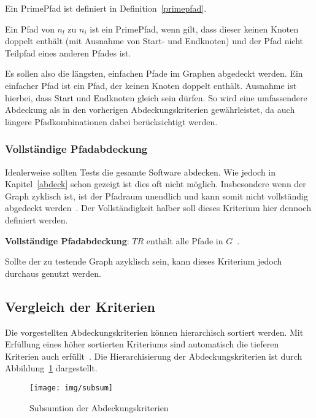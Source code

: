 Ein PrimePfad ist definiert in Definition~\ref{primepfad}.

\begin{definition}
    Ein Pfad von $n_{l}$ zu $n_{i}$ ist ein PrimePfad, wenn gilt, dass dieser keinen Knoten doppelt enthält (mit Ausnahme von Start- und Endknoten) und
    der Pfad nicht Teilpfad eines anderen Pfades ist.
    \label{primepfad}
\end{definition}

Es sollen also die längsten, einfachen Pfade im Graphen abgedeckt werden.
Ein einfacher Pfad ist ein Pfad, der keinen Knoten doppelt enthält.
Ausnahme ist hierbei, dass Start und Endknoten gleich sein dürfen.
So wird eine umfassendere Abdeckung als in den vorherigen Abdeckungskriterien gewährleistet, da auch längere Pfadkombinationen dabei berücksichtigt werden.

\subsubsection{Vollständige Pfadabdeckung}

Idealerweise sollten Tests die gesamte Software abdecken.
Wie jedoch in Kapitel~\ref{abdeck} schon gezeigt ist dies oft nicht möglich.
Insbesondere wenn der Graph zyklisch ist, ist der Pfadraum unendlich und kann somit nicht vollständig abgedeckt werden~\cite[vgl. S. 36 ]{software-testing}.
Der Vollständigkeit halber soll dieses Kriterium hier dennoch definiert werden.

\begin{definition}
    \textbf{Vollständige Pfadabdeckung}: $TR$ enthält alle Pfade in $G$~\cite[vgl. Criterion 2.7]{software-testing}.
    \label{completecov}
\end{definition}

Sollte der zu testende Graph azyklisch sein, kann dieses Kriterium jedoch durchaus genutzt werden.

\subsection{Vergleich der Kriterien}
\label{vglkrits}

Die vorgestellten Abdeckungskriterien können hierarchisch sortiert werden.
Mit Erfüllung eines höher sortierten Kriteriums sind automatisch die tieferen Kriterien auch erfüllt~\cite[vgl. Figure 2.15]{software-testing}.
Die Hierarchisierung der Abdeckungskriterien ist durch Abbildung~\ref{abdeckhier} dargestellt.

\begin{figure}[H]
    \centering
    \texttt{[image: img/subsum]}
    \caption{Subsumtion der Abdeckungskriterien}
    \label{abdeckhier}
\end{figure}

